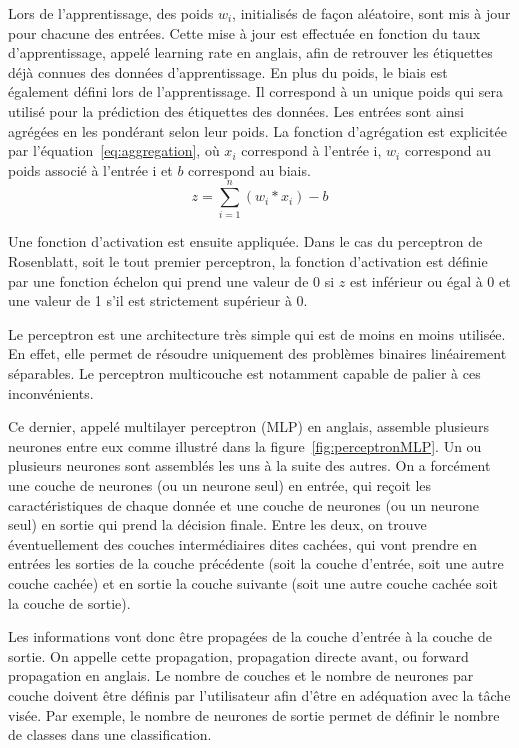 Lors de l'apprentissage, des poids $w_i$, initialisés de façon aléatoire, sont mis à jour pour chacune des entrées. Cette mise à jour est effectuée en fonction du taux d'apprentissage, appelé learning rate en anglais, afin de retrouver les étiquettes déjà connues des données d'apprentissage. En plus du poids, le biais est également défini lors de l'apprentissage. Il correspond à un unique poids qui sera utilisé pour la prédiction des étiquettes des données. Les entrées sont ainsi agrégées en les pondérant selon leur poids. La fonction d'agrégation est explicitée par l'équation~\ref{eq:aggregation}, où $x_i$ correspond à l'entrée i, $w_i$ correspond au poids associé à l'entrée i et $b$ correspond au biais.
\begin{equation}
  z = \sum_{i=1}^{n}(w_i*x_i) - b
  \label{eq:aggregation}
\end{equation}

Une fonction d'activation est ensuite appliquée. Dans le cas du perceptron de Rosenblatt, soit le tout premier perceptron, la fonction d'activation est définie par une fonction échelon qui prend une valeur de 0 si $z$ est inférieur ou égal à 0 et une valeur de 1 s'il est strictement supérieur à 0.

Le perceptron est une architecture très simple qui est de moins en moins utilisée. En effet, elle permet de résoudre uniquement des problèmes binaires linéairement séparables. Le perceptron multicouche est notamment capable de palier à ces inconvénients.


Ce dernier, appelé multilayer perceptron (MLP) en anglais, assemble plusieurs neurones entre eux comme illustré dans la figure~\ref{fig:perceptronMLP}. Un ou plusieurs neurones sont assemblés les uns à la suite des autres. On a forcément une couche de neurones (ou un neurone seul) en entrée, qui reçoit les caractéristiques de chaque donnée et une couche de neurones (ou un neurone seul) en sortie qui prend la décision finale. Entre les deux, on trouve éventuellement des couches intermédiaires dites cachées, qui vont prendre en entrées les sorties de la couche précédente (soit la couche d'entrée, soit une autre couche cachée) et en sortie la couche suivante (soit une autre couche cachée soit la couche de sortie).

Les informations vont donc être propagées de la couche d'entrée à la couche de sortie. On appelle cette propagation, propagation directe avant, ou forward propagation en anglais. Le nombre de couches et le nombre de neurones par couche doivent être définis par l'utilisateur afin d'être en adéquation avec la tâche visée. Par exemple, le nombre de neurones de sortie permet de définir le nombre de classes dans une classification.

